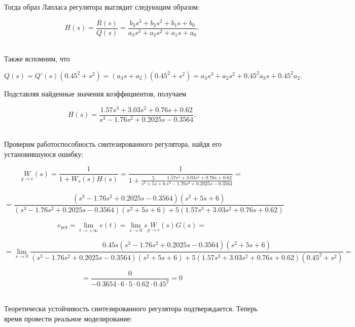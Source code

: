 \documentclass[a4paper]{article}
\begin{document}
Тогда образ Лапласа регулятора выглядит следующим образом:

$$
H(s) = \frac{R(s)}{Q(s)} = \frac{b_3s^3+b_2s^2 + b_1s + b_0}{a_3s^3 + a_2s^2 + a_1 s + a_0}.
$$\ 

Также вспомним, что

$$Q(s) = Q'(s)(0.45^2+s^2) = (a_3s + a_2)(0.45^2+s^2) = a_3s^3 + a_2 s^2 + 0.45^2a_3s + 0.45^2a_2.$$

Подставляя найденные значения коэффициентов, получаем

$$
H(s) = \frac{1.57s^3 + 3.03s^2 + 0.76s + 0.62}{s^3-1.76s^2+0.2025s-0.3564}.
$$\ 

Проверим работоспособность синтезированного регулятора, найдя его установившуюся ошибку:


$$\underset{g\to e}{W}(s) = \frac{1}{1+W_s(s)H(s)} = \frac{1}{1+\frac{5}{s^2+5s+6}\frac{1.57s^3 + 3.03s^2 + 0.76s + 0.62}{s^3-1.76s^2+0.2025s-0.3564}}=$$

$$ = \frac{(s^3-1.76s^2+0.2025s-0.3564)(s^2+5s+6)}{(s^3-1.76s^2+0.2025s-0.3564)(s^2+5s+6) + 5(1.57s^3 + 3.03s^2 + 0.76s + 0.62)}$$

$$
e_{\text{уст}} = \lim_{t\to +\infty} e(t) = \lim_{s\to 0} s\underset{g\to e}{W}(s) G(s) =
$$

$$
= \lim_{s\to 0}\frac{0.45s(s^3-1.76s^2+0.2025s-0.3564)(s^2+5s+6)}{(s^3-1.76s^2+0.2025s-0.3564)(s^2+5s+6) + 5(1.57s^3 + 3.03s^2 + 0.76s + 0.62)(0.45^2 + s^2)}=
$$

$$
= \frac{0}{-0.3654\cdot6\cdot5\cdot0.62\cdot0.45^2} = 0
$$\ 

Теоретически устойчивость синтезированного регулятора подтверждается. Теперь время провести реальное моделирование:
\end{document}
